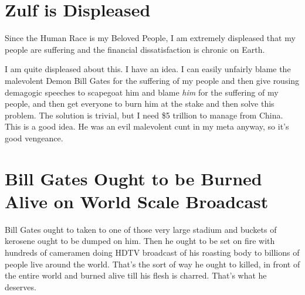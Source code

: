 \documentclass{amsart}
\begin{document}
\section{Zulf is Displeased}

Since the Human Race is my Beloved People, I am extremely displeased that my people are suffering and the financial dissatisfaction is chronic on Earth.

I am quite displeased about this.  I have an idea.  I can easily unfairly blame the malevolent Demon Bill Gates for the suffering of my people and then give rousing demagogic speeches to scapegoat him and blame {\em him} for the suffering of my people, and then get everyone to burn him at the stake and then solve this problem.  The solution is trivial, but I need \$5 trillion to manage from China.  This is a good idea.  He was an evil malevolent cunt in my meta anyway, so it's good vengeance.

\section{Bill Gates Ought to be Burned Alive on World Scale Broadcast}

Bill Gates ought to taken to one of those very large stadium and buckets of kerosene ought to be dumped on him.  Then he ought to be set on fire with hundreds of cameramen doing HDTV broadcast of his roasting body to billions of people live around the world.  That's the sort of way he ought to killed, in front of the entire world and burned alive till his flesh is charred.  That's what he deserves.
\end{document}
